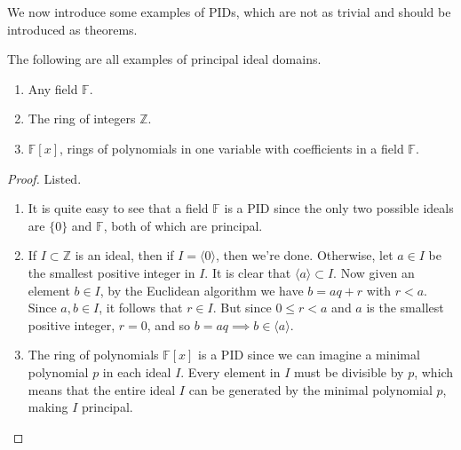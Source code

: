   We now introduce some examples of PIDs, which are not as trivial and should be introduced as theorems. 

  \begin{theorem}
    The following are all examples of principal ideal domains. 
    \begin{enumerate}
      \item Any field $\mathbb{F}$. 
      \item The ring of integers $\mathbb{Z}$. 
      \item $\mathbb{F}[x]$, rings of polynomials in one variable with coefficients in a field $\mathbb{F}$. 
    \end{enumerate}
  \end{theorem}
  \begin{proof}
    Listed. 
    \begin{enumerate}
      \item It is quite easy to see that a field $\mathbb{F}$ is a PID since the only two possible ideals are $\{0\}$ and $\mathbb{F}$, both of which are principal. 
      \item If $I \subset \mathbb{Z}$ is an ideal, then if $I = \langle 0 \rangle$, then we're done. Otherwise, let $a \in I$ be the smallest positive integer in $I$. It is clear that $\langle a \rangle \subset I$. Now given an element $b \in I$, by the Euclidean algorithm we have $b = aq + r$ with $r < a$. Since $a, b \in I$, it follows that $r \in I$. But since $0 \leq r < a$ and $a$ is the smallest positive integer, $r = 0$, and so $b = aq \implies b \in \langle a \rangle$. 
      \item The ring of polynomials $\mathbb{F}[x]$ is a PID since we can imagine a minimal polynomial $p$ in each ideal $I$. Every element in $I$ must be divisible by $p$, which means that the entire ideal $I$ can be generated by the minimal polynomial $p$, making $I$ principal.  
    \end{enumerate}
  \end{proof}


